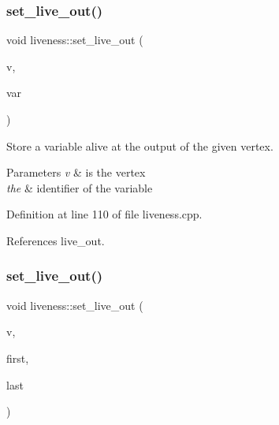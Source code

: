\subsubsection{\texorpdfstring{set\+\_\+live\+\_\+out()}{set\_live\_out()}\hspace{0.1cm}{\footnotesize\ttfamily [2/3]}}
{\footnotesize\ttfamily void liveness\+::set\+\_\+live\+\_\+out (\begin{DoxyParamCaption}\item[{const \hyperlink{graph_8hpp_abefdcf0544e601805af44eca032cca14}{vertex} \&}]{v,  }\item[{unsigned int}]{var }\end{DoxyParamCaption})}



Store a variable alive at the output of the given vertex. 


\begin{DoxyParams}{Parameters}
{\em v} & is the vertex \\
\hline
{\em the} & identifier of the variable \\
\hline
\end{DoxyParams}


Definition at line 110 of file liveness.\+cpp.



References live\+\_\+out.

\mbox{\label{classliveness_a57fd8db659aa918263fdb67b40626d5a}} 
\subsubsection{\texorpdfstring{set\+\_\+live\+\_\+out()}{set\_live\_out()}\hspace{0.1cm}{\footnotesize\ttfamily [3/3]}}
{\footnotesize\ttfamily void liveness\+::set\+\_\+live\+\_\+out (\begin{DoxyParamCaption}\item[{const \hyperlink{graph_8hpp_abefdcf0544e601805af44eca032cca14}{vertex} \&}]{v,  }\item[{const \hyperlink{classCustomOrderedSet}{Custom\+Ordered\+Set}$<$ unsigned int $>$\+::const\+\_\+iterator}]{first,  }\item[{const \hyperlink{classCustomOrderedSet}{Custom\+Ordered\+Set}$<$ unsigned int $>$\+::const\+\_\+iterator}]{last }\end{DoxyParamCaption})}



